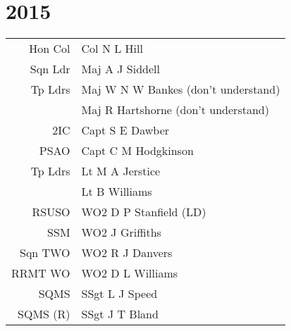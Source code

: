 \chapter*{2015}

\begin{center}
  \begin{tabular}{rl}
    Hon Col & Col N L Hill \\
    Sqn Ldr & Maj A J Siddell \\
    Tp Ldrs & Maj W N W Bankes (don't understand) \\
     & Maj R Hartshorne (don't understand) \\
    2IC & Capt S E Dawber \\
    PSAO & Capt C M Hodgkinson \\
    Tp Ldrs & Lt M A Jerstice \\
     & Lt B Williams \\
    RSUSO & WO2 D P Stanfield (LD) \\
    SSM & WO2 J Griffiths \\
    Sqn TWO & WO2 R J Danvers \\
    RRMT WO & WO2 D L Williams \\
    SQMS & SSgt L J Speed \\
    SQMS (R) & SSgt J T Bland \\
  \end{tabular}
\end{center}

